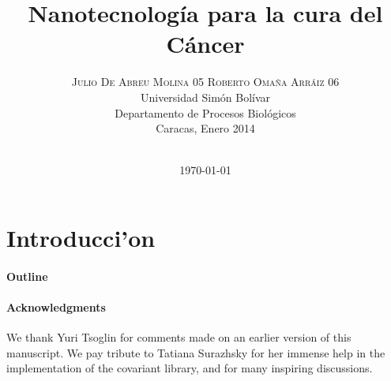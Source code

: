 \documentclass[11pt]{article}
\title{Nanotecnolog\'ia para la cura del C\'ancer}
\author{
        \textsc{Julio De Abreu Molina 05\-38072}
            \qquad
        \textsc{Roberto Oma\~na Arr\'aiz 06\-39990}
        \mbox{}\\ %
        Universidad Sim\'on Bol\'ivar\\
        Departamento de Procesos Biol\'ogicos\\
        Caracas, Enero 2014\\
        \mbox{}\\ %
}
\date{\today}
\numberwithin{figure}{section}
\begin{document}
\maketitle

\begin{abstract}

\end{abstract}

\section{Introducci'on}


\paragraph{Outline}



\paragraph{Acknowledgments}
We thank Yuri Tsoglin for comments made on an
    earlier version of this manuscript.
We pay tribute to Tatiana Surazhsky for her immense help
    in the implementation of the covariant library, and for
    many inspiring discussions.




\end{document}
